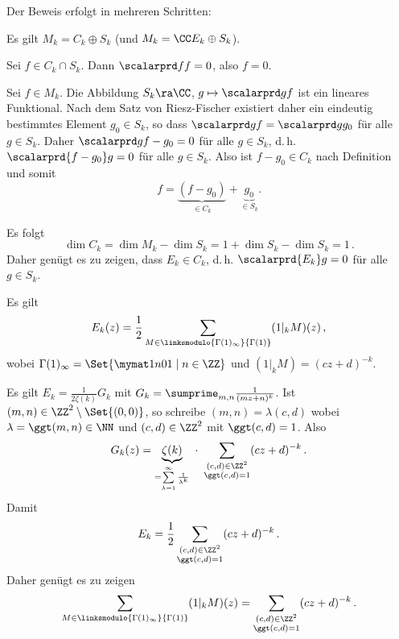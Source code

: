 \begin{bewe}

	Der Beweis erfolgt in mehreren Schritten:
	\vspace{-2em}

\begin{lemm}
	Es gilt $M_k = C_k \oplus S_k$ (und $M_k = \CC E_k \oplus S_k$).
\end{lemm}

\begin{bewe}
	Sei $f \in C_k \cap S_k$. Dann $\scalarprd ff = 0$, also $f = 0$.
	
	Sei $f \in M_k$.
	Die Abbildung $S_k \ra \CC$, $g \mapsto \scalarprd gf$ ist ein lineares Funktional.
	Nach dem Satz von Riesz-Fischer existiert daher ein eindeutig bestimmtes Element $g_0 \in S_k$, so dass $\scalarprd gf = \scalarprd g{g_0}$ für alle $g \in S_k$.
	Daher $\scalarprd g{f-g_0} = 0$ für alle $g\in S_k$, d.\,h. $\scalarprd {f-g_0}g = 0$ für alle $g \in S_k$.
	Also ist $f-g_0 \in C_k$ nach Definition und somit
	\[
		f = \underbrace{(f-g_0)}_{\in C_k} + \underbrace{g_0}_{\in S_k} .
	\]
\end{bewe}

Es folgt
\[
	\dim C_k = \dim M_k - \dim S_k = 1 + \dim S_k - \dim S_k = 1\,.
\]
Daher genügt es zu zeigen, dass $E_k \in C_k$, d.\,h. $\scalarprd{E_k}g = 0$ für alle $g \in S_k$.

\begin{lemm}
	Es gilt
	\[
		E_k(z) = \frac{1}{2} \sum_{M \in \linksmodulo{\Gamma(1)_\infty}{\Gamma(1)}} (1|_k M)(z)\,,
	\]
	wobei $\Gamma(1)_\infty = \Set{\mymat 1n01 \mid n \in \ZZ}$ und $(1|_k M) = (cz+d)^{-k}$.
\end{lemm}

\begin{bewe}
	Es gilt $E_k = \frac{1}{2\zeta(k)} G_k$ mit $G_k = \sumprime_{m,n} \frac{1}{(mz+n)^k}$.
	Ist $(m,n) \in \ZZ^2\setminus\Set{(0,0)}$, so schreibe $(m,n) = \lambda (c,d)$ wobei $\lambda = \ggt(m,n) \in \NN$ und $(c,d) \in \ZZ^2$ mit $\ggt(c,d) = 1$.
	Also
	\[
		G_k(z)
		= \underbrace{\zeta(k)}_{= \sum\limits_{\lambda=1}^\infty \frac{1}{\lambda^k}}\ \cdot\ \sum_{\substack{(c,d) \in \ZZ^2 \\ \ggt(c,d) = 1}} (cz+d)^{-k}
		\,.
	\]
	Damit
	\[
		E_k = \frac{1}{2} \sum_{\substack{(c,d) \in \ZZ^2 \\ \ggt(c,d) = 1}} (cz+d)^{-k}
		\,.
	\]
	Daher genügt es zu zeigen
	\[
		\sum_{M \in \linksmodulo{\Gamma(1)_\infty}{\Gamma(1)}} (1|_k M)(z)
		= \sum_{\substack{(c,d) \in \ZZ^2 \\ \ggt(c,d) = 1}} (cz+d)^{-k}
		\,.
	\]
	

\end{bewe}
\end{bewe}
